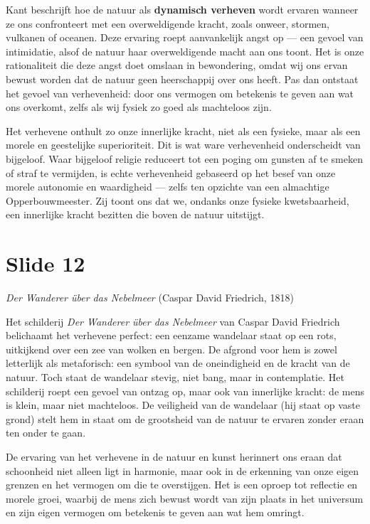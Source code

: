 \documentclass{article}
\begin{document}
Kant beschrijft hoe de natuur als \textbf{dynamisch verheven} wordt ervaren wanneer ze ons confronteert met een overweldigende kracht, zoals onweer, stormen, vulkanen of oceanen. Deze ervaring roept aanvankelijk angst op — een gevoel van intimidatie, alsof de natuur haar overweldigende macht aan ons toont. Het is onze rationaliteit die deze angst doet omslaan in bewondering, omdat wij ons ervan bewust worden dat de natuur geen heerschappij over ons heeft. Pas dan ontstaat het gevoel van verhevenheid: door ons vermogen om betekenis te geven aan wat ons overkomt, zelfs als wij fysiek zo goed als machteloos zijn.

Het verhevene onthult zo onze innerlijke kracht, niet als een fysieke, maar als een morele en geestelijke superioriteit. Dit is wat ware verhevenheid onderscheidt van bijgeloof. Waar bijgeloof religie reduceert tot een poging om gunsten af te smeken of straf te vermijden, is echte verhevenheid gebaseerd op het besef van onze morele autonomie en waardigheid — zelfs ten opzichte van een almachtige Opperbouwmeester. Zij toont ons dat we, ondanks onze fysieke kwetsbaarheid, een innerlijke kracht bezitten die boven de natuur uitstijgt.

\section*{Slide 12}

\epigraph{\textit{Der Wanderer über das Nebelmeer} (Caspar David Friedrich, 1818)}{}

Het schilderij \textit{Der Wanderer über das Nebelmeer} van Caspar David Friedrich belichaamt het verhevene perfect: een eenzame wandelaar staat op een rots, uitkijkend over een zee van wolken en bergen. De afgrond voor hem is zowel letterlijk als metaforisch: een symbool van de oneindigheid en de kracht van de natuur. Toch staat de wandelaar stevig, niet bang, maar in contemplatie. Het schilderij roept een gevoel van ontzag op, maar ook van innerlijke kracht: de mens is klein, maar niet machteloos. De veiligheid van de wandelaar (hij staat op vaste grond) stelt hem in staat om de grootsheid van de natuur te ervaren zonder eraan ten onder te gaan.

De ervaring van het verhevene in de natuur en kunst herinnert ons eraan dat schoonheid niet alleen ligt in harmonie, maar ook in de erkenning van onze eigen grenzen en het vermogen om die te overstijgen. Het is een oproep tot reflectie en morele groei, waarbij de mens zich bewust wordt van zijn plaats in het universum en zijn eigen vermogen om betekenis te geven aan wat hem omringt.
\end{document}
